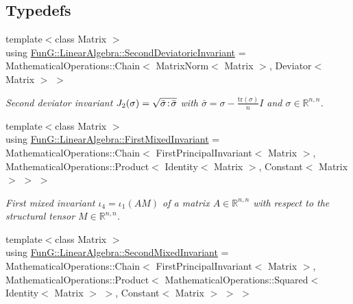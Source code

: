 \subsection*{Typedefs}
\begin{DoxyCompactItemize}
\item 
\hypertarget{group__InvariantGroup_gaf8a18782f27b6d5e505eae594eaebaee}{{\footnotesize template$<$class Matrix $>$ }\\using \hyperlink{group__InvariantGroup_gaf8a18782f27b6d5e505eae594eaebaee}{Fun\-G\-::\-Linear\-Algebra\-::\-Second\-Deviatoric\-Invariant} = Mathematical\-Operations\-::\-Chain$<$ Matrix\-Norm$<$ Matrix $>$, Deviator$<$ Matrix $>$ $>$}\label{group__InvariantGroup_gaf8a18782f27b6d5e505eae594eaebaee}

\begin{DoxyCompactList}\small\item\em Second deviator invariant $ J_2(\sigma)=\sqrt{\bar\sigma\negthinspace:\negthinspace\bar\sigma} $ with $\bar\sigma = \sigma - \frac{\mathrm{tr}(\sigma)}{n}I$ and $\sigma\in\mathbb{R}^{n,n}$. \end{DoxyCompactList}\item 
\hypertarget{group__InvariantGroup_gabfe33aa1c0f1e61928f8befbc90a7505}{{\footnotesize template$<$class Matrix $>$ }\\using \hyperlink{group__InvariantGroup_gabfe33aa1c0f1e61928f8befbc90a7505}{Fun\-G\-::\-Linear\-Algebra\-::\-First\-Mixed\-Invariant} = Mathematical\-Operations\-::\-Chain$<$ First\-Principal\-Invariant$<$ Matrix $>$, Mathematical\-Operations\-::\-Product$<$ Identity$<$ Matrix $>$, Constant$<$ Matrix $>$ $>$ $>$}\label{group__InvariantGroup_gabfe33aa1c0f1e61928f8befbc90a7505}

\begin{DoxyCompactList}\small\item\em First mixed invariant $ \iota_4=\iota_1(AM) $ of a matrix $A\in\mathbb{R}^{n,n}$ with respect to the structural tensor $M\in\mathbb{R}^{n,n}$. \end{DoxyCompactList}\item 
\hypertarget{group__InvariantGroup_gaca3bff4bfa2e55a0eaea83c60bc3aeee}{{\footnotesize template$<$class Matrix $>$ }\\using \hyperlink{group__InvariantGroup_gaca3bff4bfa2e55a0eaea83c60bc3aeee}{Fun\-G\-::\-Linear\-Algebra\-::\-Second\-Mixed\-Invariant} = Mathematical\-Operations\-::\-Chain$<$ First\-Principal\-Invariant$<$ Matrix $>$, Mathematical\-Operations\-::\-Product$<$ Mathematical\-Operations\-::\-Squared$<$ Identity$<$ Matrix $>$ $>$, Constant$<$ Matrix $>$ $>$ $>$}\label{group__InvariantGroup_gaca3bff4bfa2e55a0eaea83c60bc3aeee}


\end{DoxyCompactItemize}
